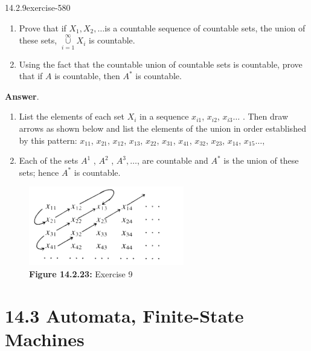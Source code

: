 \documentclass[twoside,10pt,]{book}
\numberwithin{equation}{section}
\begin{document}
\begin{divisionsolution}{14.2.9}{}{exercise-580}%
\hypertarget{p-5200}{}%
\leavevmode%
\begin{enumerate}[label=(\alph*)]
\item\hypertarget{li-2371}{}\hypertarget{p-5201}{}%
Prove that if \(X_1, X_2, \ldots\)is a countable sequence of countable sets, the union of these sets, \(\underset{i=1}{\overset{\infty }{\cup}}X_i\) is countable.%
\item\hypertarget{li-2372}{}\hypertarget{p-5202}{}%
Using the fact that the countable union of countable sets is countable, prove that if \(A\) is countable, then \(A^*\) is countable.%
\end{enumerate}
%
\par\smallskip%
\noindent\textbf{Answer}.\quad%
\hypertarget{p-5203}{}%
\leavevmode%
\begin{enumerate}[label=(\alph*)]
\item\hypertarget{li-2373}{}\hypertarget{p-5204}{}%
List the elements of each set \(X_i\)  in a sequence \(x_{i 1}\), \(x_{i 2}\), \(x_{i 3}\ldots\) . Then draw arrows as shown below and list the elements of the union in order established by this pattern:  \(x_{11}\), \(x_{21}\), \(x_{12}\), \(x_{13}\), \(x_{22}\), \(x_{31}\), \(x_{41}\), \(x_{32}\), \(x_{23}\), \(x_{14}\), \(x_{15}\ldots \),%
\item\hypertarget{li-2374}{}\hypertarget{p-5205}{}%
Each of the sets \(A^1\) , \(A^2\) , \(A^3, \ldots\), are countable and \(A^*\) is the union of these sets; hence \(A^*\) is countable.%
\end{enumerate}
%
\begin{figure}
\centering
\includegraphics[width=0.7\linewidth]{images/fig-zig-zag-countable.png}
\caption*{\textbf{Figure 14.2.23:} Exercise 9}
\end{figure}
\end{divisionsolution}%
\section*{14.3 Automata, Finite-State Machines}
\end{document}
